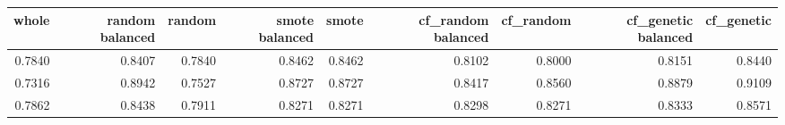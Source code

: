 \begin{tabular}{rrrrrrrrr}
\toprule

 whole &  random balanced &  random &  smote balanced &  smote &  cf\_random balanced &  cf\_random &  cf\_genetic balanced &  cf\_genetic \\
\midrule

0.7840 &           0.8407 &  0.7840 &          0.8462 & 0.8462 &              0.8102 &     0.8000 &               0.8151 &      0.8440 \\
0.7316 &           0.8942 &  0.7527 &          0.8727 & 0.8727 &              0.8417 &     0.8560 &               0.8879 &      0.9109 \\
0.7862 &           0.8438 &  0.7911 &          0.8271 & 0.8271 &              0.8298 &     0.8271 &               0.8333 &      0.8571 \\

\bottomrule
\end{tabular}

